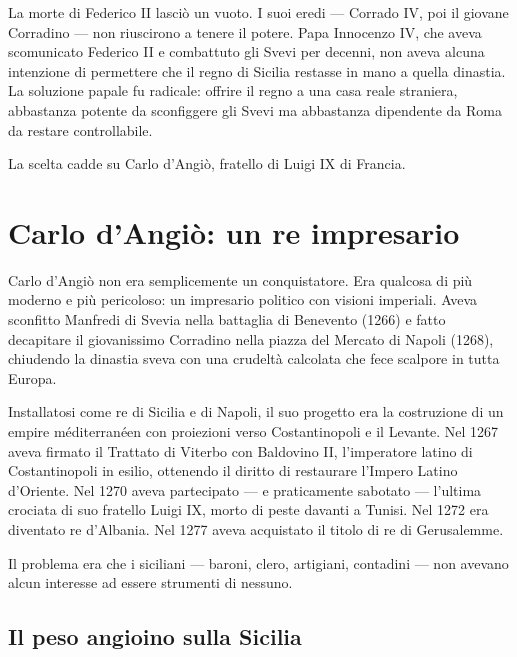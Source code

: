 La morte di Federico II lasciò un vuoto. I suoi eredi — Corrado IV, poi
il giovane Corradino — non riuscirono a tenere il potere. Papa Innocenzo
IV, che aveva scomunicato Federico II e combattuto gli Svevi per decenni,
non aveva alcuna intenzione di permettere che il regno di Sicilia restasse
in mano a quella dinastia. La soluzione papale fu radicale: offrire il
regno a una casa reale straniera, abbastanza potente da sconfiggere gli
Svevi ma abbastanza dipendente da Roma da restare controllabile.

La scelta cadde su Carlo d'Angiò, fratello di Luigi IX di Francia.

\secsep

\section{Carlo d'Angiò: un re impresario}

Carlo d'Angiò non era semplicemente un conquistatore. Era qualcosa di più
moderno e più pericoloso: un impresario politico con visioni imperiali.
Aveva sconfitto Manfredi di Svevia nella battaglia di Benevento (1266) e
fatto decapitare il giovanissimo Corradino nella piazza del Mercato di
Napoli (1268), chiudendo la dinastia sveva con una crudeltà calcolata che
fece scalpore in tutta Europa.

Installatosi come re di Sicilia e di Napoli, il suo progetto era la
costruzione di un empire méditerranéen con proiezioni verso Costantinopoli
e il Levante. Nel 1267 aveva firmato il Trattato di Viterbo con Baldovino
II, l'imperatore latino di Costantinopoli in esilio, ottenendo il diritto
di restaurare l'Impero Latino d'Oriente. Nel 1270 aveva partecipato —
e praticamente sabotato — l'ultima crociata di suo fratello Luigi IX,
morto di peste davanti a Tunisi. Nel 1272 era diventato re d'Albania.
Nel 1277 aveva acquistato il titolo di re di Gerusalemme.


Il problema era che i siciliani — baroni, clero, artigiani, contadini —
non avevano alcun interesse ad essere strumenti di nessuno.

\subsection{Il peso angioino sulla Sicilia}

